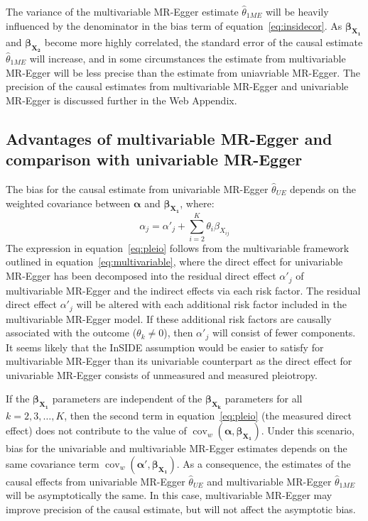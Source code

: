 \documentclass[a4paper,12pt]{article}
\DeclareMathOperator{\cov}{cov}
\begin{document}
\begin{bibunit}[wileyj]
The variance of the multivariable MR-Egger estimate $\hat{\theta}_{1ME}$ will be heavily influenced by the denominator in the bias term of equation~\ref{eq:insidecor}. As $\boldsymbol{\beta_{X_{1}}}$ and $\boldsymbol{\beta_{X_{2}}}$ become more highly correlated, the standard error of the causal estimate $\hat{\theta}_{1ME}$ will increase, and in some circumstances the estimate from multivariable MR-Egger will be less precise than the estimate from uniavriable MR-Egger. The precision of the causal estimates from multivariable MR-Egger and univariable MR-Egger is discussed further in the Web Appendix. 

\subsection{Advantages of multivariable MR-Egger and comparison with univariable MR-Egger}
\label{sec:advantages}
The bias for the causal estimate from univariable MR-Egger $\hat{\theta}_{UE}$ depends on the weighted covariance between $\boldsymbol{\alpha}$ and $\boldsymbol{\beta_{X_{1}}}$, where:
\begin{equation}
\alpha_j=\alpha'_j+\sum_{i=2}^{K} \theta_{i}\beta_{X_{ij}} \label{eq:pleio}
\end{equation}
The expression in equation~\ref{eq:pleio} follows from the multivariable framework outlined in equation~\ref{eq:multivariable}, where the direct effect for univariable MR-Egger has been decomposed into the residual direct effect $\alpha'_j$ of multivariable MR-Egger and the indirect effects via each risk factor. The residual direct effect $\alpha'_j$ will be altered with each additional risk factor included in the multivariable MR-Egger model. If these additional risk factors are causally associated with the outcome ($\theta_{k}\neq0$), then $\alpha'_j$ will consist of fewer components. It seems likely that the InSIDE assumption would be easier to satisfy for multivariable MR-Egger than its univariable counterpart as the direct effect for univariable MR-Egger consists of unmeasured and measured pleiotropy.

If the $\boldsymbol{\beta_{X_{1}}}$ parameters are independent of the $\boldsymbol{\beta_{X_{k}}}$ parameters for all $k = 2, 3, \ldots, K$, then the second term in equation~\ref{eq:pleio} (the measured direct effect) does not contribute to the value of $\cov_w(\boldsymbol{\alpha}, \boldsymbol{\beta_{X_{1}}})$. Under this scenario, bias for the univariable and multivariable MR-Egger estimates depends on the same covariance term $\cov_w(\boldsymbol{\alpha'}, \boldsymbol{\beta_{X_{1}}})$.  As a consequence, the estimates of the causal effects from univariable MR-Egger $\hat{\theta}_{UE}$ and multivariable MR-Egger $\hat{\theta}_{1ME}$ will be asymptotically the same. In this case, multivariable MR-Egger may improve precision of the causal estimate, but will not affect the asymptotic bias.


\end{bibunit}
\end{document}
